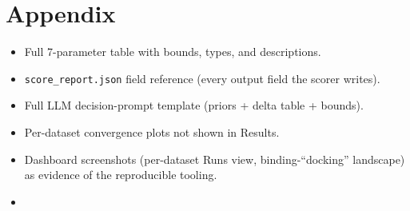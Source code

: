 \section{Appendix}
\label{appendix}

\begin{itemize}
  \item Full 7-parameter table with bounds, types, and descriptions.
  \item \texttt{score\_report.json} field reference (every output field the scorer writes).
  \item Full LLM decision-prompt template (priors + delta table + bounds).
  \item Per-dataset convergence plots not shown in Results.
  \item Dashboard screenshots (per-dataset Runs view, binding-``docking'' landscape) as evidence of the reproducible tooling.
  \item {}
\end{itemize}

